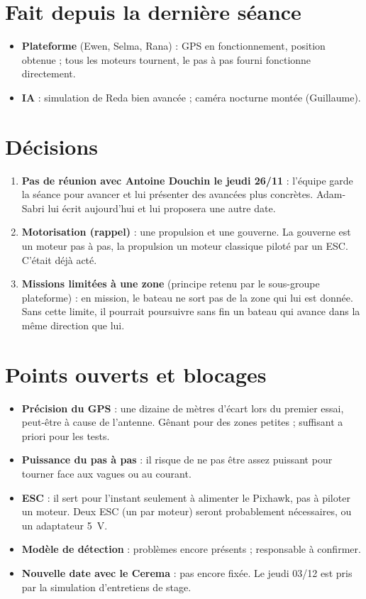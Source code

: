\documentclass[10pt,a4paper]{article}
\begin{document}
\section{Fait depuis la dernière séance}
\begin{itemize}
  \item \textbf{Plateforme} (Ewen, Selma, Rana) : GPS en fonctionnement, position obtenue ; tous les moteurs tournent, le pas à pas fourni fonctionne directement.
  \item \textbf{IA} : simulation de Reda bien avancée ; caméra nocturne montée (Guillaume).
\end{itemize}

\section{Décisions}
\begin{enumerate}[label={\color{cExp}\bfseries\arabic*.}]
  \item \textbf{Pas de réunion avec Antoine Douchin le jeudi 26/11} : l'équipe garde la séance pour avancer et lui présenter des avancées plus concrètes. Adam-Sabri lui écrit aujourd'hui et lui proposera une autre date.
  \item \textbf{Motorisation (rappel)} : une propulsion et une gouverne. La gouverne est un moteur pas à pas, la propulsion un moteur classique piloté par un ESC. C'était déjà acté.
  \item \textbf{Missions limitées à une zone} (principe retenu par le sous-groupe plateforme) : en mission, le bateau ne sort pas de la zone qui lui est donnée. Sans cette limite, il pourrait poursuivre sans fin un bateau qui avance dans la même direction que lui.
\end{enumerate}

\section{Points ouverts et blocages}
\begin{itemize}
  \item \textbf{Précision du GPS} : une dizaine de mètres d'écart lors du premier essai, peut-être à cause de l'antenne. Gênant pour des zones petites ; suffisant a priori pour les tests.
  \item \textbf{Puissance du pas à pas} : il risque de ne pas être assez puissant pour tourner face aux vagues ou au courant.
  \item \textbf{ESC} : il sert pour l'instant seulement à alimenter le Pixhawk, pas à piloter un moteur. Deux ESC (un par moteur) seront probablement nécessaires, ou un adaptateur 5~V.
  \item \textbf{Modèle de détection} : problèmes encore présents ; responsable à confirmer.
  \item \textbf{Nouvelle date avec le Cerema} : pas encore fixée. Le jeudi 03/12 est pris par la simulation d'entretiens de stage.
\end{itemize}
\end{document}

